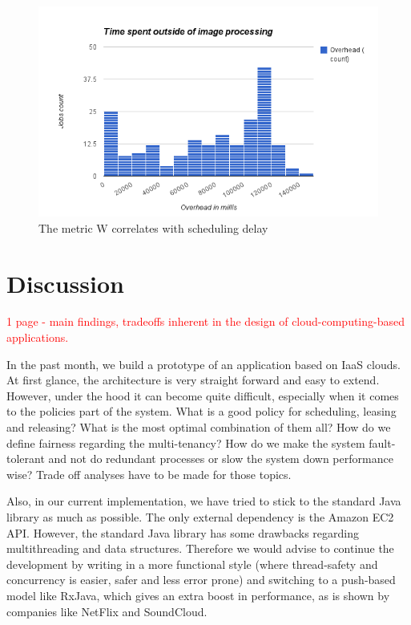 \documentclass{stylesheet}
\begin{document}
\begin{figure}[b!]
	\centering
	\includegraphics[width=\linewidth]{overhead-const.png}
	\caption{The metric W correlates with scheduling delay}
	\label{fig:scheduling-W}
\end{figure}



\section{Discussion}
\label{sec:discussion}
\textcolor{red}{1 page - main findings, tradeoffs inherent in the design of cloud-computing-based applications.}

In the past month, we build a prototype of an application based on IaaS clouds. At first glance, the architecture is very straight forward and easy to extend. However, under the hood it can become quite difficult, especially when it comes to the policies part of the system. What is a good policy for scheduling, leasing and releasing? What is the most optimal combination of them all? How do we define fairness regarding the multi-tenancy? How do we make the system fault-tolerant and not do redundant processes or slow the system down performance wise? Trade off analyses have to be made for those topics.

Also, in our current implementation, we have tried to stick to the standard Java library as much as possible. The only external dependency is the Amazon EC2 API. However, the standard Java library has some drawbacks regarding multithreading and data structures. Therefore we would advise to continue the development by writing in a more functional style (where thread-safety and concurrency is easier, safer and less error prone) and switching to a push-based model like RxJava, which gives an extra boost in performance, as is shown by companies like NetFlix and SoundCloud.
\end{document}
